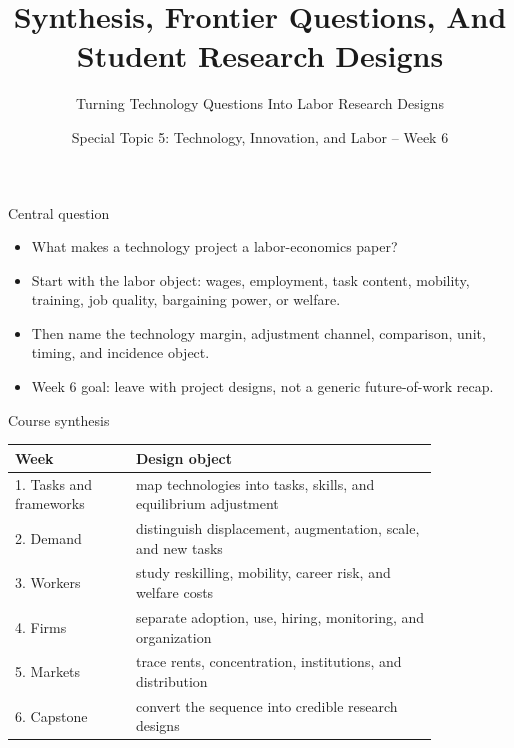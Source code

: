 \documentclass[aspectratio=169,11pt]{beamer}
\title{Synthesis, Frontier Questions, And Student Research Designs}
\subtitle{Turning Technology Questions Into Labor Research Designs}
\author{Special Topic 5: Technology, Innovation, and Labor -- Week 6}
\date{}
\begin{document}
\begin{frame}
  \titlepage
\end{frame}

\begin{frame}{Central question}
\begin{itemize}
    \item What makes a technology project a labor-economics paper?
    \item Start with the labor object: wages, employment, task content, mobility, training, job quality, bargaining power, or welfare.
    \item Then name the technology margin, adjustment channel, comparison, unit, timing, and incidence object.
    \item Week 6 goal: leave with project designs, not a generic future-of-work recap.
\end{itemize}
\end{frame}

\begin{frame}{Course synthesis}
\small
\begin{tabular}{p{0.24\linewidth} p{0.60\linewidth}}
\toprule
Week & Design object \\
\midrule
1. Tasks and frameworks & map technologies into tasks, skills, and equilibrium adjustment \\
2. Demand & distinguish displacement, augmentation, scale, and new tasks \\
3. Workers & study reskilling, mobility, career risk, and welfare costs \\
4. Firms & separate adoption, use, hiring, monitoring, and organization \\
5. Markets & trace rents, concentration, institutions, and distribution \\
6. Capstone & convert the sequence into credible research designs \\
\bottomrule
\end{tabular}
\end{frame}
\end{document}
